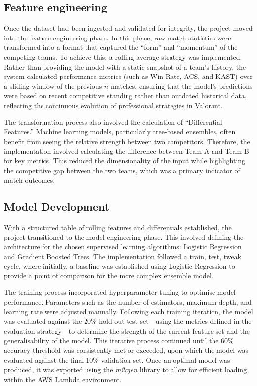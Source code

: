 \subsection{Feature engineering}
Once the dataset had been ingested and validated for integrity, the project moved into the feature engineering phase. In this phase, raw match statistics were transformed into a format that captured the ``form'' and ``momentum'' of the competing teams. To achieve this, a rolling average strategy was implemented. Rather than providing the model with a static snapshot of a team's history, the system calculated performance metrics (such as Win Rate, ACS, and KAST) over a sliding window of the previous $n$ matches, ensuring that the model's predictions were based on recent competitive standing rather than outdated historical data, reflecting the continuous evolution of professional strategies in Valorant.

The transformation process also involved the calculation of ``Differential Features.'' Machine learning models, particularly tree-based ensembles, often benefit from seeing the relative strength between two competitors. Therefore, the implementation involved calculating the difference between Team A and Team B for key metrics. This reduced the dimensionality of the input while highlighting the competitive gap between the two teams, which was a primary indicator of match outcomes.

\subsection{Model Development}
With a structured table of rolling features and differentials established, the project transitioned to the model engineering phase. This involved defining the architecture for the chosen supervised learning algorithms: Logistic Regression and Gradient Boosted Trees. The implementation followed a train, test, tweak cycle, where initially, a baseline was established using Logistic Regression to provide a point of comparison for the more complex ensemble model.

The training process incorporated hyperparameter tuning to optimise model performance. Parameters such as the number of estimators, maximum depth, and learning rate were adjusted manually. Following each training iteration, the model was evaluated against the 20\% hold-out test set---using the metrics defined in the evaluation strategy---to determine the strength of the current feature set and the generalisability of the model. This iterative process continued until the 60\% accuracy threshold was consistently met or exceeded, upon which the model was evaluated against the final 10\% validation set. Once an optimal model was produced, it was exported using the \textit{m2cgen} library to allow for efficient loading within the AWS Lambda environment.

